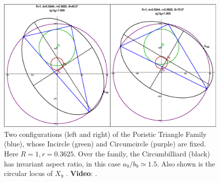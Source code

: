 \begin{figure}
    \centering
    \includegraphics[width=\textwidth]{pics_eps_new/0160_poristic_cb.eps}
    \caption{Two configurations (left and right) of the Poristic Triangle Family (blue), whose Incircle (green) and Circumcircle (purple) are fixed. Here $R=1,r=0.3625$. Over the family, the Circumbilliard (black) has invariant aspect ratio, in this case $a_9/b_9{\simeq}1.5$. Also shown is the circular locus of $X_9$ \cite[page 17]{odehnal2011-poristic}. \textbf{Video}: \cite[PL\#07]{reznik2020-playlist-circum}.}
    \label{fig:cb-poristic}
\end{figure}